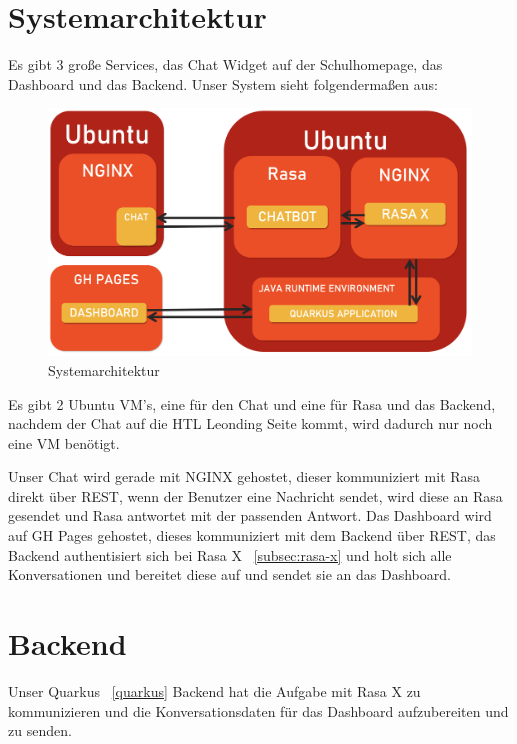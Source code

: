 \section{Systemarchitektur}\label{sec:systemarchitektur}

Es gibt 3 große Services, das Chat Widget auf der Schulhomepage, das Dashboard und das Backend.
Unser System sieht folgendermaßen aus:

\begin{figure}[hbt!]
    \centering
    \includegraphics[scale=0.2]{pics/systemarchitektur}
    \caption{Systemarchitektur}
    \label{fig:impl:architektur}
\end{figure}

Es gibt 2 Ubuntu VM's, eine für den Chat und eine für Rasa und das Backend, nachdem der Chat auf die HTL Leonding Seite kommt, wird dadurch nur noch eine VM benötigt.

Unser Chat wird gerade mit NGINX gehostet, dieser kommuniziert mit Rasa direkt über REST, wenn der Benutzer eine Nachricht sendet, wird diese an Rasa gesendet und Rasa antwortet mit der passenden Antwort.
Das Dashboard wird auf GH Pages gehostet, dieses kommuniziert mit dem Backend über REST, das Backend authentisiert sich bei Rasa X ~\ref{subsec:rasa-x} und holt sich alle Konversationen und bereitet diese auf und sendet sie an das Dashboard.

\section{Backend}\label{sec:backend}

Unser Quarkus ~\ref{quarkus} Backend hat die Aufgabe mit Rasa X zu kommunizieren und die Konversationsdaten für das Dashboard aufzubereiten und zu senden.

